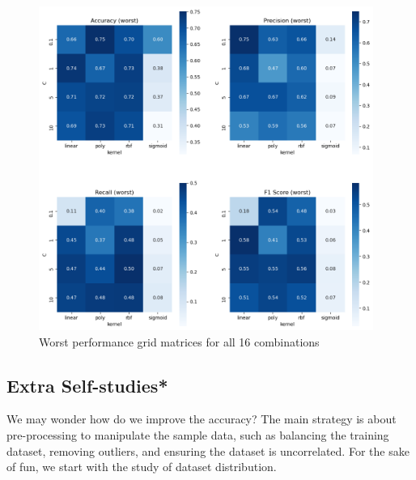 \documentclass{tron}
\begin{document}
\begin{figure}[H]
\centering
	\includegraphics[height=400px]{../src_code/output/p1/unmodified/Summary_unmodified_worst}
	\caption{Worst performance grid matrices for all 16 combinations}
	\label{table:performance-grid:worst}
\end{figure}

\clearpage
\subsection{Extra Self-studies*}
We may wonder how do we improve the accuracy? The main strategy is about pre-processing to manipulate the sample data, such as balancing the training dataset, removing outliers, and ensuring the dataset is uncorrelated. For the sake of fun, we start with the study of dataset distribution.
\end{document}
